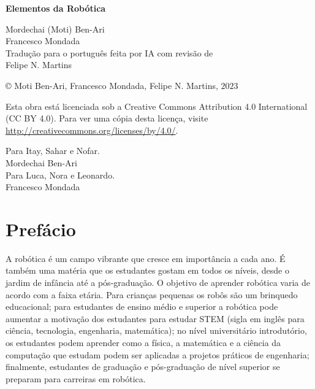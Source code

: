 
\begin{center}
\mbox{}

\vspace{6ex}

\textsf{\bfseries\huge Elementos da Robótica}

\vspace{16ex}

\textsf{\large Mordechai (Moti) Ben-Ari\\[4pt]Francesco Mondada\\[20pt]
Tradução para o português feita por IA com revisão de \\[4pt]
Felipe N. Martins}

\end{center}

\vfill

\begin{center}
\copyright{} Moti Ben-Ari, Francesco Mondada, Felipe N. Martins, $2023$
 \end{center}
 
\begin{small}
Esta obra está licenciada sob a Creative Commons Attribution 4.0 International (CC BY 4.0). Para ver uma cópia desta licença, visite \url{http://creativecommons.org/licenses/by/4.0/}.
\end{small}


\newpage
\mbox{}
\vfill
\begin{flushright}
Para Itay, Sahar e Nofar.\\[4pt]
Mordechai Ben-Ari\\[18pt]

Para Luca, Nora e Leonardo.\\[4pt]
Francesco Mondada
\end{flushright}
\vfill
\mbox{}
\newpage

\chapter*{Prefácio}

A robótica é um campo vibrante que cresce em importância a cada ano. É também uma matéria que os estudantes gostam em todos os níveis, desde o jardim de infância até a pós-graduação. O objetivo de aprender robótica varia de acordo com a faixa etária. Para crianças pequenas os robôs são um brinquedo educacional; para estudantes de ensino médio e superior a robótica pode aumentar a motivação dos estudantes para estudar STEM (sigla em inglês para ciência, tecnologia, engenharia, matemática); no nível universitário introdutório, os estudantes podem aprender como a física, a matemática e a ciência da computação que estudam podem ser aplicadas a projetos práticos de engenharia; finalmente, estudantes de graduação e pós-graduação de nível superior se preparam para carreiras em robótica.

